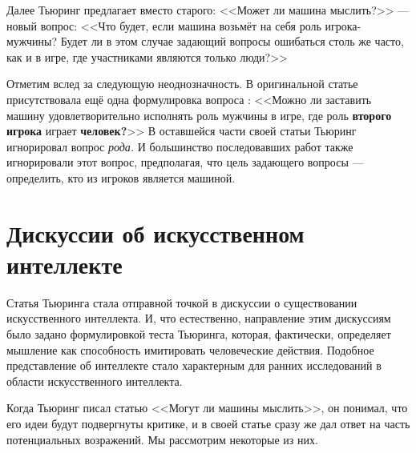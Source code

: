 \documentclass[a4paper,14pt]{scrartcl}
\begin{document}
Далее Тьюринг предлагает вместо старого: <<Может ли машина мыслить?>> — новый вопрос: <<Что будет, если машина возьмёт на себя роль игрока-мужчины? Будет ли в этом случае задающий вопросы ошибаться столь же часто, как и в игре, где участниками являются только люди?>>

Отметим вслед за \cite{sayagin_2000} следующую неоднозначность. В оригинальной статье присутствовала ещё одна формулировка вопроса \cite[стр. 442]{turing_1950}: <<Можно ли заставить машину удовлетворительно исполнять роль мужчины в игре, где роль {\bf второго игрока} играет {\bf человек?}>> В оставшейся части своей статьи Тьюринг игнорировал вопрос {\it рода.} И большинство последовавших работ также игнорировали этот вопрос, предполагая, что цель задающего вопросы — определить, кто из игроков является машиной.

\section{Дискуссии об искусственном интеллекте}

Статья Тьюринга стала отправной точкой в дискуссии о существовании искусственного интеллекта. И, что естественно, направление этим дискуссиям было задано формулировкой теста Тьюринга, которая, фактически, определяет мышление как способность имитировать человеческие действия. Подобное представление об интеллекте стало характерным для ранних исследований в области искусственного интеллекта.

Когда Тьюринг писал статью <<Могут ли машины мыслить>>, он понимал, что его идеи  будут подвергнуты критике, и в своей статье сразу же дал ответ на часть потенциальных возражений. Мы рассмотрим некоторые из них.




\end{document}

